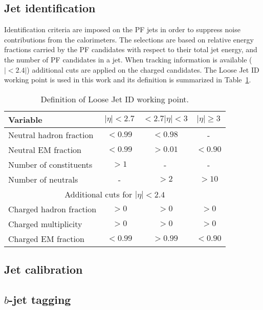 \subsection{Jet identification}
Identification criteria are imposed on the PF jets in order to suppress noise contributions from the calorimeters. 
The selections are based on relative energy fractions carried by the PF candidates with respect to their total jet energy, and the number of PF candidates in a jet. 
When tracking information is available ($|<2.4|$) additional cuts are applied on the charged candidates.  
The Loose Jet ID working point is used in this work and its definition is summarized in Table~\ref{tab:jetId}. 

\begin{table}[ht!]
\def\arraystretch{1.2}
    \caption{Definition of Loose Jet ID working point.}
    \label{tab:jetId}
    \begin{center}
        \begin{tabular}{ l c c c }
        \hline \hline
        Variable               &  $|\eta|<2.7$&  $<2.7|\eta|<3$ &  $|\eta|\geq3$     \\ \hline
        Neutral hadron fraction & $<0.99$   & $<0.98$  & -      \\
        Neutral EM fraction & $<0.99$   & $>0.01$  & $<0.90$      \\
        Number of constituents & $>1$    & -  & -      \\
        Number of neutrals & -    & $>2$  & $>10$      \\
        \multicolumn{4}{c}{Additional cuts for $|\eta|<2.4$}                \\
        Charged hadron fraction & $>0$   & $>0$  & $>0$      \\
        Charged multiplicity & $>0$   & $>0$  & $>0$      \\
        Charged EM fraction & $<0.99$   & $>0.99$  & $<0.90$      \\
\hline\hline
\end{tabular}
\end{center}
\end{table}                                                                             
\subsection{Jet calibration}

\subsection{$b$-jet tagging}
